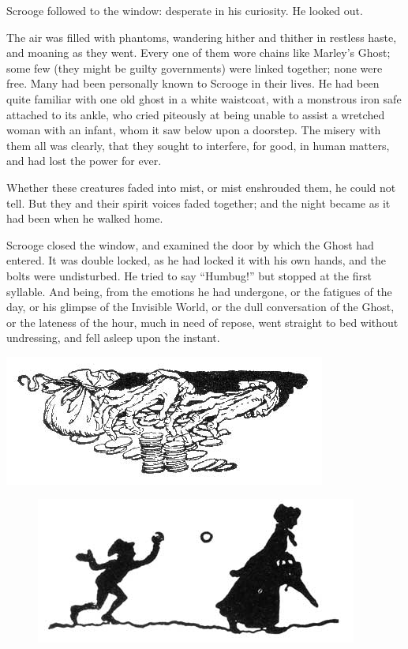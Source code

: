 \documentclass[paper=5.5in:8.5in,BCOR=15mm,twoside,DIV=15,headinclude=off,12pt,chapterprefix=off,openany,headings=huge]{scrbook} %
\begin{document}
Scrooge followed to the window: desperate in his curiosity. He looked out.

The air was filled with phantoms, wandering hither and thither in restless haste, and moaning as they went. Every one of them wore chains like Marley's Ghost; some few (they might be guilty governments) were linked together; none were free. Many had been personally known to Scrooge in their lives. He had been quite familiar with one old ghost in a white waistcoat, with a monstrous iron safe attached to its ankle, who cried piteously at being unable to assist a wretched woman with an infant, whom it saw below upon a doorstep. The misery with them all was clearly, that they sought to interfere, for good, in human matters, and had lost the power for ever.

Whether these creatures faded into mist, or mist enshrouded them, he could not tell. But they and their spirit voices faded together; and the night became as it had been when he walked home.

Scrooge closed the window, and examined the door by which the Ghost had entered. It was double locked, as he had locked it with his own hands, and the bolts were undisturbed. He tried to say \enquote{Humbug!} but stopped at the first syllable. And being, from the emotions he had undergone, or the fatigues of the day, or his glimpse of the Invisible World, or the dull conversation of the Ghost, or the lateness of the hour, much in need of repose, went straight to bed without undressing, and fell asleep upon the instant.

\begin{minipage}[c]{\linewidth}
\includegraphics[width=\linewidth]{gs053}
\end{minipage}


\begin{figure}[h]
\centering
\includegraphics[width=.5\linewidth]{gs012}
\end{figure}
\end{document}
